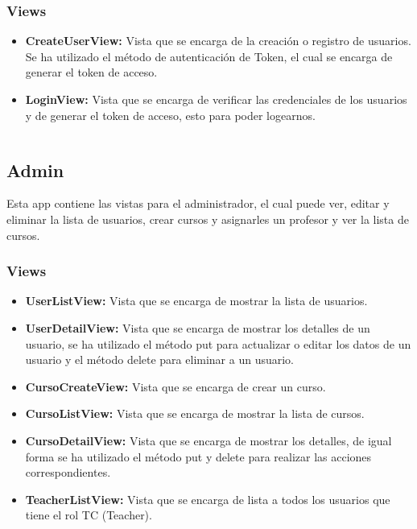 \documentclass{article}
\begin{document}
\subsubsection{Views}
\begin{itemize}
	\item \textbf{CreateUserView:} Vista que se encarga de la creación o registro de usuarios. Se ha utilizado el método de autenticación de Token, el cual se encarga de generar el token de acceso.
	\item \textbf{LoginView:} Vista que se encarga de verificar las credenciales de los usuarios y de generar el token de acceso, esto para poder logearnos.
\end{itemize}
\inputminted{python3}{../backend/system/views.py}
\subsection{Admin}
Esta app contiene las vistas para el administrador, el cual puede ver, editar y eliminar la lista de usuarios, crear cursos y asignarles un profesor y ver la lista de cursos.
\subsubsection{Views}
\begin{itemize}
	\item \textbf{UserListView:} Vista que se encarga de mostrar la lista de usuarios.
	\item \textbf{UserDetailView:} Vista que se encarga de mostrar los detalles de un usuario, se ha utilizado el método put para actualizar o editar los datos de un usuario y el método delete para eliminar a un usuario.
	\item \textbf{CursoCreateView:} Vista que se encarga de crear un curso.
	\item \textbf{CursoListView:} Vista que se encarga de mostrar la lista de cursos.
	\item \textbf{CursoDetailView:} Vista que se encarga de mostrar los detalles, de igual forma se ha utilizado el método put y delete para realizar las acciones correspondientes.
	\item \textbf{TeacherListView:} Vista que se encarga de lista a todos los usuarios que tiene el rol TC (Teacher).
\end{itemize}
\inputminted{python3}{../backend/admin/views.py}
\end{document}
